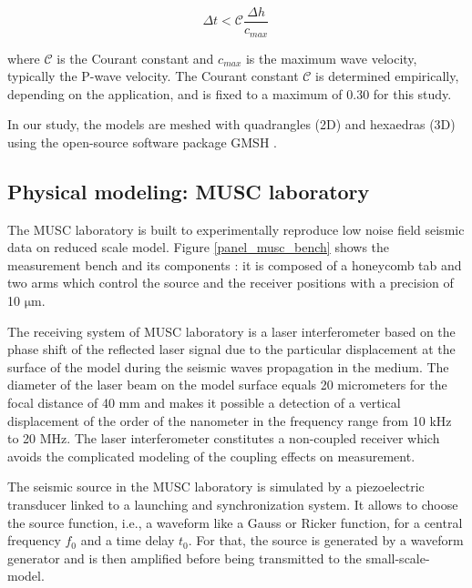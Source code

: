 \documentclass[manuscript,revised]{geophysics}
\begin{document}
\begin{equation}
	\Delta t < \mathcal{C}\frac{\Delta h}{c_{max}}\,   
\end{equation}

\noindent where $\mathcal{C}$ is the Courant constant and $c_{max}$ is the maximum wave velocity, typically the P-wave velocity. The Courant constant $\mathcal{C}$ is determined empirically, depending on the application, and is fixed to a maximum of 0.30 for this study.

\noindent In our study, the models are meshed with quadrangles (2D) and hexaedras (3D) using the open-source software package GMSH \citep{Geuzaine_MSH_2009}. 


\subsection{Physical modeling: MUSC laboratory}

\noindent The MUSC laboratory \citep{Bretaudeau_SSA_2008b,Bretaudeau_SSM_2011,Bretaudeau_FWI_2013} is built to experimentally reproduce low noise field seismic data on reduced scale model. Figure \ref{panel_musc_bench} shows the measurement bench and its components : it is composed of a honeycomb tab and two arms which control the source and the receiver positions with a precision of 10 $\mathrm{\mu m}$.

\noindent The receiving system of MUSC laboratory is a laser interferometer based on the phase shift of the reflected laser signal due to the particular displacement at the surface of the model during the seismic waves propagation in the medium. The diameter of the laser beam on the model surface equals 20 micrometers for the focal distance of 40 mm and makes it possible a detection of a vertical displacement of the order of the nanometer in the frequency range from 10 kHz to 20 MHz. The laser interferometer constitutes a non-coupled receiver which avoids the complicated modeling of the coupling effects on measurement.

\noindent The seismic source in the MUSC laboratory is simulated by a piezoelectric transducer linked to a launching and synchronization system. It allows to choose the source function, i.e., a waveform like a Gauss or Ricker function, for a central frequency $f_{0}$ and a time delay $t_{0}$. For that, the source is generated by a waveform generator and is then amplified before being transmitted to the small-scale-model.
\end{document}

